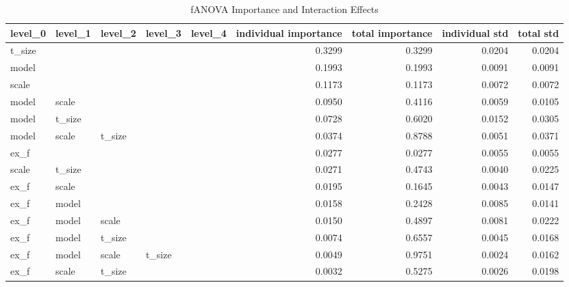 \begin{table}
\centering
\caption{fANOVA Importance and Interaction Effects}
\label{tab:fanova_importance}
\begin{tabular}{lllllrrrr}
\toprule
level\_0 & level\_1 & level\_2 & level\_3 & level\_4 & individual importance & total importance & individual std & total std \\
\midrule
 t\_size &         &         &         &         &                0.3299 &           0.3299 &         0.0204 &    0.0204 \\
  model &         &         &         &         &                0.1993 &           0.1993 &         0.0091 &    0.0091 \\
  scale &         &         &         &         &                0.1173 &           0.1173 &         0.0072 &    0.0072 \\
  model &   scale &         &         &         &                0.0950 &           0.4116 &         0.0059 &    0.0105 \\
  model &  t\_size &         &         &         &                0.0728 &           0.6020 &         0.0152 &    0.0305 \\
  model &   scale &  t\_size &         &         &                0.0374 &           0.8788 &         0.0051 &    0.0371 \\
   ex\_f &         &         &         &         &                0.0277 &           0.0277 &         0.0055 &    0.0055 \\
  scale &  t\_size &         &         &         &                0.0271 &           0.4743 &         0.0040 &    0.0225 \\
   ex\_f &   scale &         &         &         &                0.0195 &           0.1645 &         0.0043 &    0.0147 \\
   ex\_f &   model &         &         &         &                0.0158 &           0.2428 &         0.0085 &    0.0141 \\
   ex\_f &   model &   scale &         &         &                0.0150 &           0.4897 &         0.0081 &    0.0222 \\
   ex\_f &   model &  t\_size &         &         &                0.0074 &           0.6557 &         0.0045 &    0.0168 \\
   ex\_f &   model &   scale &  t\_size &         &                0.0049 &           0.9751 &         0.0024 &    0.0162 \\
   ex\_f &   scale &  t\_size &         &         &                0.0032 &           0.5275 &         0.0026 &    0.0198 \\

\end{tabular}
\end{table}
